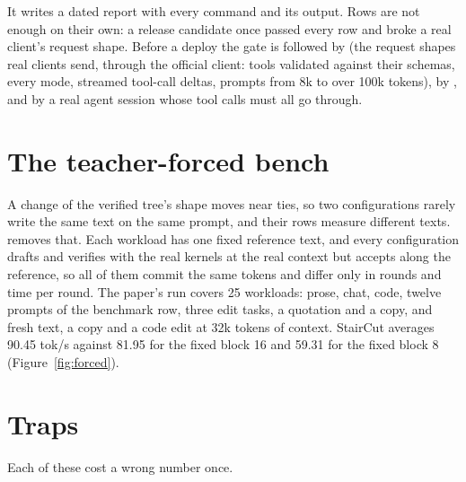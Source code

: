 It writes a dated report with every command and its output. Rows are not enough on their own: a release candidate once passed every row and broke a real client's request shape. Before a deploy the gate is followed by  (the request shapes real clients send, through the official  client: tools validated against their schemas, every  mode, streamed tool-call deltas, prompts from 8k to over 100k tokens), by , and by a real agent session whose tool calls must all go through.

\section{The teacher-forced bench}

A change of the verified tree's shape moves near ties, so two configurations rarely write the same text on the same prompt, and their rows measure different texts.  removes that. Each workload has one fixed reference text, and every configuration drafts and verifies with the real kernels at the real context but accepts along the reference, so all of them commit the same tokens and differ only in rounds and time per round. The paper's run covers 25 workloads: prose, chat, code, twelve prompts of the benchmark row, three edit tasks, a quotation and a copy, and fresh text, a copy and a code edit at 32k tokens of context. StairCut averages 90.45 tok/s against 81.95 for the fixed block 16 and 59.31 for the fixed block 8 (Figure~\ref{fig:forced}).

\section{Traps}

Each of these cost a wrong number once.

